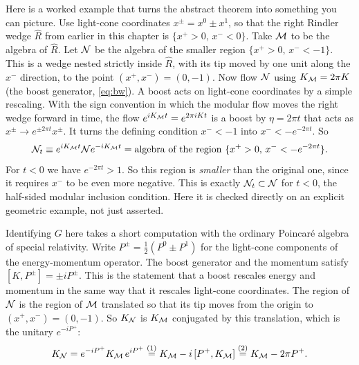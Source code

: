 Here is a worked example that turns the abstract theorem into something you can picture. Use light-cone
coordinates $x^\pm=x^0\pm x^1$, so that the right Rindler wedge $\widehat R$ from earlier in this chapter is
$\{x^+>0,\,x^-<0\}$. Take $\mathcal{M}$ to be the algebra of $\widehat R$. Let $\mathcal{N}$ be the algebra of the smaller region
$\{x^+>0,\,x^-<-1\}$. This is a wedge nested strictly inside $\widehat R$, with its tip moved by one unit along
the $x^-$ direction, to the point $(x^+,x^-)=(0,-1)$. Now flow $\mathcal{N}$ using $K_{\mathcal{M}}=2\pi K$ (the boost generator,
\eqref{eq:bw}). A boost acts on light-cone coordinates by a simple rescaling. With the sign convention in which
the modular flow moves the right wedge forward in time, the flow $e^{iK_{\mathcal{M}} t}=e^{2\pi iKt}$ is a boost by
$\eta=2\pi t$ that acts as $x^\pm\to e^{\pm2\pi t}x^\pm$. It turns the defining condition $x^-<-1$ into
$x^-<-e^{-2\pi t}$. So
\[
\mathcal{N}_t \equiv e^{iK_{\mathcal{M}} t}\mathcal{N} e^{-iK_{\mathcal{M}} t} = \text{algebra of the region } \{x^+>0,\,x^-<-e^{-2\pi t}\} .
\]
For $t<0$ we have $e^{-2\pi t}>1$. So this region is \emph{smaller} than the original one, since it requires
$x^-$ to be even more negative. This is exactly $\mathcal{N}_t\subset\mathcal{N}$ for $t<0$, the half-sided modular inclusion
condition. Here it is checked directly on an explicit geometric example, not just asserted.

Identifying $G$ here takes a short computation with the ordinary Poincar\'e algebra of special relativity.
Write $P^\pm=\tfrac12(P^0\pm P^1)$ for the light-cone components of the energy-momentum operator. The boost
generator and the momentum satisfy $[K,P^\pm]=\pm iP^\pm$. This is the statement that a boost rescales energy
and momentum in the same way that it rescales light-cone coordinates. The region of $\mathcal{N}$ is the region of $\mathcal{M}$
translated so that its tip moves from the origin to $(x^+,x^-)=(0,-1)$. So $K_{\mathcal{N}}$ is $K_{\mathcal{M}}$ conjugated by this
translation, which is the unitary $e^{-iP^+}$:
\begin{align}
K_{\mathcal{N}} = e^{-iP^+}K_{\mathcal{M}}\,e^{iP^+} \overset{(1)}{=} K_{\mathcal{M}} - i\,[P^+,K_{\mathcal{M}}] \overset{(2)}{=} K_{\mathcal{M}} - 2\pi P^+ . \notag
\end{align}
\quad
{}

